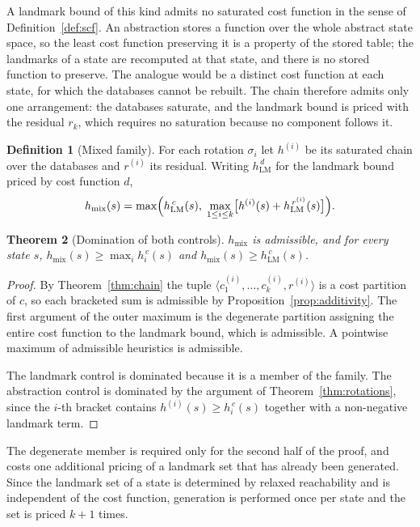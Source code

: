 \documentclass[10pt,twocolumn,a4paper]{article}
\theoremstyle{plain}
\newtheorem{theorem}{Theorem}
\theoremstyle{definition}
\newtheorem{definition}[theorem]{Definition}
\theoremstyle{remark}
\begin{document}
A landmark bound of this kind admits no saturated cost function in the sense of
Definition~\ref{def:scf}. An abstraction stores a function over the whole
abstract state space, so the least cost function preserving it is a property of
the stored table; the landmarks of a state are recomputed at that state, and
there is no stored function to preserve. The analogue would be a distinct cost
function at each state, for which the databases cannot be rebuilt. The chain
therefore admits only one arrangement: the databases saturate, and the landmark
bound is priced with the residual $r_k$, which requires no saturation because
no component follows it.

\begin{definition}[Mixed family]
\label{def:mixed}
For each rotation $\sigma_i$ let $h^{(i)}$ be its saturated chain over the
databases and $r^{(i)}$ its residual. Writing $h_{\mathrm{LM}}^{\,d}$ for the
landmark bound priced by cost function $d$,
\[
  h_{\mathrm{mix}}(s) = \max\Bigl( h_{\mathrm{LM}}^{\,c}(s),\;
  \max_{1 \le i \le k} \bigl[ h^{(i)}(s) + h_{\mathrm{LM}}^{\,r^{(i)}}(s) \bigr]
  \Bigr).
\]
\end{definition}

\begin{theorem}[Domination of both controls]
\label{thm:mixed}
$h_{\mathrm{mix}}$ is admissible, and for every state $s$,
$h_{\mathrm{mix}}(s) \ge \max_i h_i^{\,c}(s)$ and
$h_{\mathrm{mix}}(s) \ge h_{\mathrm{LM}}^{\,c}(s)$.
\end{theorem}

\begin{proof}
By Theorem~\ref{thm:chain} the tuple
$\langle c_1^{(i)}, \dots, c_k^{(i)}, r^{(i)} \rangle$ is a cost partition of
$c$, so each bracketed sum is admissible by
Proposition~\ref{prop:additivity}. The first argument of the outer maximum is
the degenerate partition assigning the entire cost function to the landmark
bound, which is admissible. A pointwise maximum of admissible heuristics is
admissible.

The landmark control is dominated because it is a member of the family. The
abstraction control is dominated by the argument of
Theorem~\ref{thm:rotations}, since the $i$-th bracket contains
$h^{(i)}(s) \ge h_i^{\,c}(s)$ together with a non-negative landmark term.
\end{proof}

The degenerate member is required only for the second half of the proof, and
costs one additional pricing of a landmark set that has already been generated.
Since the landmark set of a state is determined by relaxed reachability and is
independent of the cost function, generation is performed once per state and
the set is priced $k+1$ times.
\end{document}
